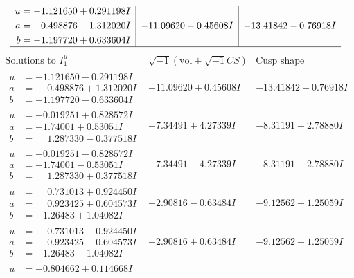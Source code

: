 \documentclass[1p]{elsarticle_modified}
\theoremstyle{definition}
\newcommand{\I}{\sqrt{-1}}
\begin{document}
$$\begin{array}{c|c|c}
\begin{aligned}
u &= -1.121650 + 0.291198 I \\
a &= \phantom{-}0.498876 - 1.312020 I \\
b &= -1.197720 + 0.633604 I\end{aligned}
 & -11.09620 - 0.45608 I & -13.41842 - 0.76918 I\\
 \hline 
 \end{array}$$\newpage$$\begin{array}{c|c|c}  
\text{Solutions to }I^u_{1}& \I (\text{vol} + \sqrt{-1}CS) & \text{Cusp shape}\\
 \hline 
\begin{aligned}
u &= -1.121650 - 0.291198 I \\
a &= \phantom{-}0.498876 + 1.312020 I \\
b &= -1.197720 - 0.633604 I\end{aligned}
 & -11.09620 + 0.45608 I & -13.41842 + 0.76918 I \\ \hline\begin{aligned}
u &= -0.019251 + 0.828572 I \\
a &= -1.74001 + 0.53051 I \\
b &= \phantom{-}1.287330 - 0.377518 I\end{aligned}
 & -7.34491 + 4.27339 I & -8.31191 - 2.78880 I \\ \hline\begin{aligned}
u &= -0.019251 - 0.828572 I \\
a &= -1.74001 - 0.53051 I \\
b &= \phantom{-}1.287330 + 0.377518 I\end{aligned}
 & -7.34491 - 4.27339 I & -8.31191 + 2.78880 I \\ \hline\begin{aligned}
u &= \phantom{-}0.731013 + 0.924450 I \\
a &= \phantom{-}0.923425 + 0.604573 I \\
b &= -1.26483 + 1.04082 I\end{aligned}
 & -2.90816 - 0.63484 I & -9.12562 + 1.25059 I \\ \hline\begin{aligned}
u &= \phantom{-}0.731013 - 0.924450 I \\
a &= \phantom{-}0.923425 - 0.604573 I \\
b &= -1.26483 - 1.04082 I\end{aligned}
 & -2.90816 + 0.63484 I & -9.12562 - 1.25059 I \\ \hline\begin{aligned}
u &= -0.804662 + 0.114668 I \\

\end{aligned}
\end{array}$$
\end{document}
